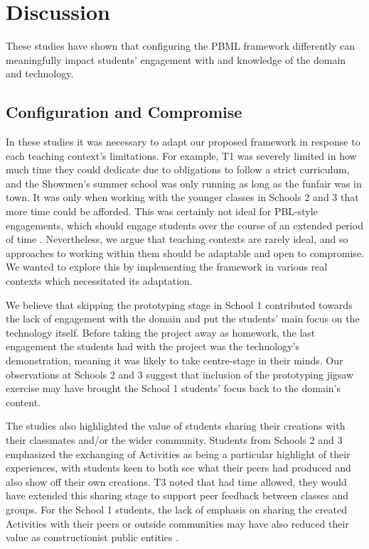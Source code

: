 \documentclass[,hyphens]{sigchi}
\begin{document}
\section{Discussion}

These studies have shown that configuring the PBML framework differently can meaningfully impact students' engagement with and knowledge of the domain and technology.

\subsection{Configuration and Compromise}
In these studies it was necessary to adapt our proposed framework in response to each teaching context's limitations. For example, T1 was severely limited in how much time they could dedicate due to obligations to follow a strict curriculum, and the Showmen's summer school was only running as long as the funfair was in town. It was only when working with the younger classes in Schools 2 and 3 that more time could be afforded. This was certainly not ideal for PBL-style engagements, which should engage students over the course of an extended period of time \cite{Blumenfeld1991}. Nevertheless, we argue that teaching contexts are rarely ideal, and so approaches to working within them should be adaptable and open to compromise. We wanted to explore this by implementing the framework in various real contexts which necessitated its adaptation.

We believe that skipping the prototyping stage in School 1 contributed towards the lack of engagement with the domain and put the students' main focus on the technology itself. Before taking the project away as homework, the last engagement the students had with the project was the technology's demonstration, meaning it was likely to take centre-stage in their minds. Our observations at Schools 2 and 3 suggest that inclusion of the prototyping jigsaw exercise may have brought the School 1 students' focus back to the domain's content.

The studies also highlighted the value of students sharing their creations with their classmates and/or the wider community. Students from Schools 2 and 3 emphasized the exchanging of Activities as being a particular highlight of their experiences, with students keen to both see what their peers had produced and also show off their own creations. T3 noted that had time allowed, they would have extended this sharing stage to support peer feedback between classes and groups. For the School 1 students, the lack of emphasis on sharing the created Activities with their peers or outside communities may have also reduced their value as constructionist public entities \cite{PapertSeymourandHarel1991a}.
\end{document}
